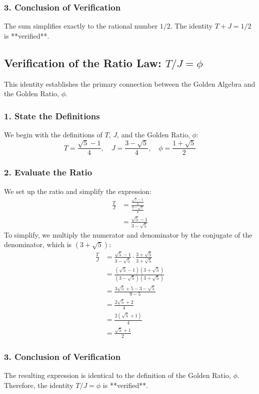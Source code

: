 \subsubsection*{3. Conclusion of Verification}
The sum simplifies exactly to the rational number $1/2$. The identity $T+J = 1/2$ is **verified**.
\newpage
\subsection{Verification of the Ratio Law: \texorpdfstring{\(T / J = \phi\)}{T / J = phi}}
This identity establishes the primary connection between the Golden Algebra and the Golden Ratio, $\phi$.

\subsubsection*{1. State the Definitions}
We begin with the definitions of $T$, $J$, and the Golden Ratio, $\phi$:
$$ T = \frac{\sqrt{5}-1}{4}, \quad J = \frac{3-\sqrt{5}}{4}, \quad \phi = \frac{1+\sqrt{5}}{2} $$

\subsubsection*{2. Evaluate the Ratio}
We set up the ratio and simplify the expression:
\begin{align*}
\frac{T}{J} &= \frac{\frac{\sqrt{5}-1}{4}}{\frac{3-\sqrt{5}}{4}} \\
&= \frac{\sqrt{5}-1}{3-\sqrt{5}}
\end{align*}
To simplify, we multiply the numerator and denominator by the conjugate of the denominator, which is $(3+\sqrt{5})$:
\begin{align*}
\frac{T}{J} &= \frac{\sqrt{5}-1}{3-\sqrt{5}} \cdot \frac{3+\sqrt{5}}{3+\sqrt{5}} \\
&= \frac{(\sqrt{5}-1)(3+\sqrt{5})}{(3-\sqrt{5})(3+\sqrt{5})} \\
&= \frac{3\sqrt{5}+5-3-\sqrt{5}}{9-5} \\
&= \frac{2\sqrt{5}+2}{4} \\
&= \frac{2(\sqrt{5}+1)}{4} \\
&= \frac{\sqrt{5}+1}{2}
\end{align*}

\subsubsection*{3. Conclusion of Verification}
The resulting expression is identical to the definition of the Golden Ratio, $\phi$. Therefore, the identity $T/J = \phi$ is **verified**.

